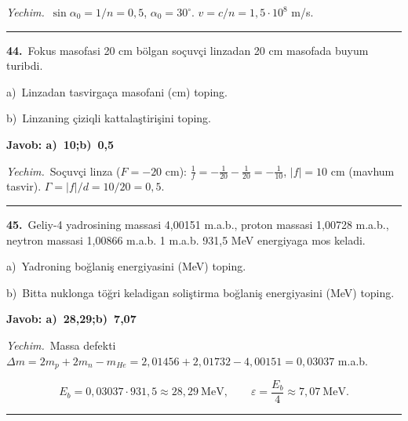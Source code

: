 \documentclass[11pt,a4paper]{article}
\begin{document}
\noindent\textit{Yechim.}\ $\sin\alpha_0=1/n=0{,}5$, $\alpha_0=30^\circ$. $v=c/n=1{,}5\cdot10^8$ m/s.\par\par\medskip\hrule\medskip
{}\noindent\textbf{44.}\ Fokus masofasi 20 cm bölgan soçuvçi linzadan 20 cm masofada buyum turibdi.\par
\noindent\hspace*{4mm}a)\ Linzadan tasvirgaça masofani (cm) toping.\par
\noindent\hspace*{4mm}b)\ Linzaning çiziqli kattalaştirişini toping.\par
\noindent\colorbox{gray!12}{\parbox{\dimexpr\linewidth-2\fboxsep}{\textbf{Javob: a)\ 10;\quad b)\ 0,5}}}\par\smallskip
\noindent\textit{Yechim.}\ Soçuvçi linza ($F=-20$ cm): $\frac1f=-\frac1{20}-\frac1{20}=-\frac1{10}$, $|f|=10$ cm (mavhum tasvir). $\Gamma=|f|/d=10/20=0{,}5$.\par\par\medskip\hrule\medskip
{}\noindent\textbf{45.}\ Geliy-4 yadrosining massasi 4,00151 m.a.b., proton massasi 1,00728 m.a.b., neytron massasi 1,00866 m.a.b. 1 m.a.b. 931,5 MeV energiyaga mos keladi.\par
\noindent\hspace*{4mm}a)\ Yadroning boğlaniş energiyasini (MeV) toping.\par
\noindent\hspace*{4mm}b)\ Bitta nuklonga töğri keladigan soliştirma boğlaniş energiyasini (MeV) toping.\par
\noindent\colorbox{gray!12}{\parbox{\dimexpr\linewidth-2\fboxsep}{\textbf{Javob: a)\ 28,29;\quad b)\ 7,07}}}\par\smallskip
\noindent\textit{Yechim.}\ Massa defekti $\Delta m=2m_p+2m_n-m_{He}=2{,}01456+2{,}01732-4{,}00151=0{,}03037$ m.a.b.\par
\[E_b=0{,}03037\cdot931{,}5\approx28{,}29\ \text{MeV},\qquad \varepsilon=\frac{E_b}{4}\approx7{,}07\ \text{MeV}.\]\par\medskip\hrule\medskip
\end{document}
